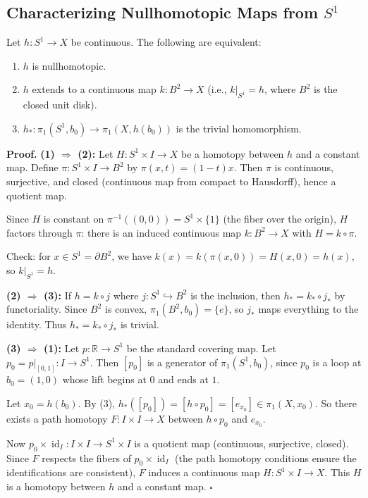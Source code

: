 \documentclass[11pt]{report}
\renewenvironment{proof}[1][Proof]{\noindent\textbf{#1.} }{\hfill$\square$\par\vspace{5pt}}
\begin{document}
\subsection{Characterizing Nullhomotopic Maps from $S^1$}

\begin{lembox}
Let $h: S^1 \to X$ be continuous. The following are equivalent:
\begin{enumerate}
    \item $h$ is nullhomotopic.
    \item $h$ extends to a continuous map $k: B^2 \to X$ (i.e., $k|_{S^1} = h$, where $B^2$ is the closed unit disk).
    \item $h_*: \pi_1(S^1, b_0) \to \pi_1(X, h(b_0))$ is the trivial homomorphism.
\end{enumerate}
\end{lembox}

\begin{proof}
\textbf{(1) $\Rightarrow$ (2):} Let $H: S^1 \times I \to X$ be a homotopy between $h$ and a constant map. Define $\pi: S^1 \times I \to B^2$ by $\pi(x, t) = (1-t)x$. Then $\pi$ is continuous, surjective, and closed (continuous map from compact to Hausdorff), hence a quotient map.

Since $H$ is constant on $\pi^{-1}((0,0)) = S^1 \times \{1\}$ (the fiber over the origin), $H$ factors through $\pi$: there is an induced continuous map $k: B^2 \to X$ with $H = k \circ \pi$.

Check: for $x \in S^1 = \partial B^2$, we have $k(x) = k(\pi(x, 0)) = H(x, 0) = h(x)$, so $k|_{S^1} = h$.

\textbf{(2) $\Rightarrow$ (3):} If $h = k \circ j$ where $j: S^1 \hookrightarrow B^2$ is the inclusion, then $h_* = k_* \circ j_*$ by functoriality. Since $B^2$ is convex, $\pi_1(B^2, b_0) = \{e\}$, so $j_*$ maps everything to the identity. Thus $h_* = k_* \circ j_*$ is trivial.

\textbf{(3) $\Rightarrow$ (1):} Let $p: \mathbb{R} \to S^1$ be the standard covering map. Let $p_0 = p|_{[0,1]}: I \to S^1$. Then $[p_0]$ is a generator of $\pi_1(S^1, b_0)$, since $p_0$ is a loop at $b_0 = (1,0)$ whose lift begins at $0$ and ends at $1$.

Let $x_0 = h(b_0)$. By (3), $h_*([p_0]) = [h \circ p_0] = [e_{x_0}] \in \pi_1(X, x_0)$. So there exists a path homotopy $F: I \times I \to X$ between $h \circ p_0$ and $e_{x_0}$.

Now $p_0 \times \operatorname{id}_I: I \times I \to S^1 \times I$ is a quotient map (continuous, surjective, closed). Since $F$ respects the fibers of $p_0 \times \operatorname{id}_I$ (the path homotopy conditions ensure the identifications are consistent), $F$ induces a continuous map $H: S^1 \times I \to X$. This $H$ is a homotopy between $h$ and a constant map.
\end{proof}
\end{document}
